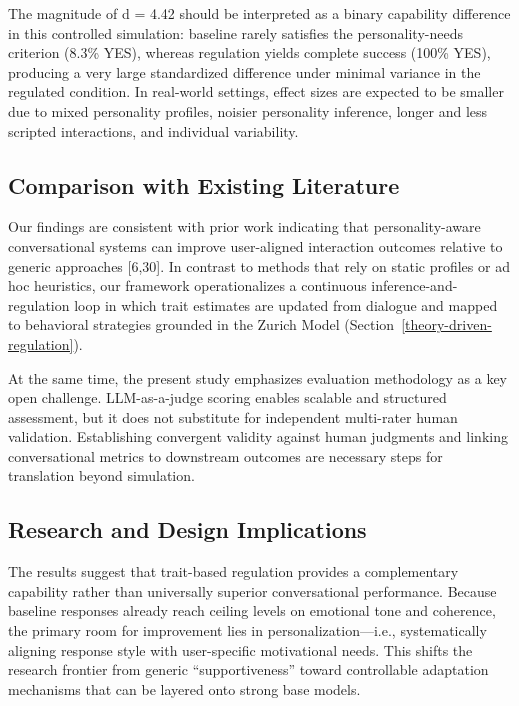 The magnitude of d = 4.42 should be interpreted as a binary capability difference in this controlled simulation: baseline rarely satisfies the personality-needs criterion (8.3\% YES), whereas regulation yields complete success (100\% YES), producing a very large standardized difference under minimal variance in the regulated condition. In real-world settings, effect sizes are expected to be smaller due to mixed personality profiles, noisier personality inference, longer and less scripted interactions, and individual variability.

\subsection{Comparison with Existing Literature}\label{comparison-with-existing-literature}

Our findings are consistent with prior work indicating that personality-aware conversational systems can improve user-aligned interaction outcomes relative to generic approaches {[}6,30{]}. In contrast to methods that rely on static profiles or ad hoc heuristics, our framework operationalizes a continuous inference-and-regulation loop in which trait estimates are updated from dialogue and mapped to behavioral strategies grounded in the Zurich Model (Section~\ref{theory-driven-regulation}).

At the same time, the present study emphasizes evaluation methodology as a key open challenge. LLM-as-a-judge scoring enables scalable and structured assessment, but it does not substitute for independent multi-rater human validation. Establishing convergent validity against human judgments and linking conversational metrics to downstream outcomes are necessary steps for translation beyond simulation.

\subsection{Research and Design Implications}\label{research-and-design-implications}

The results suggest that trait-based regulation provides a complementary capability rather than universally superior conversational performance. Because baseline responses already reach ceiling levels on emotional tone and coherence, the primary room for improvement lies in personalization---i.e., systematically aligning response style with user-specific motivational needs. This shifts the research frontier from generic ``supportiveness'' toward controllable adaptation mechanisms that can be layered onto strong base models.

